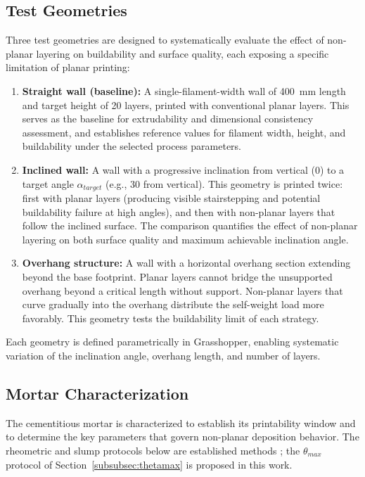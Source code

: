 \documentclass[conference]{IEEEtran}
\begin{document}
\subsection{Test Geometries}
\label{subsec:geom}

Three test geometries are designed to systematically evaluate the effect of non-planar layering on buildability and surface quality, each exposing a specific limitation of planar printing:

\begin{enumerate}
    \item \textbf{Straight wall (baseline):} A single-filament-width wall of 400~mm length and target height of 20 layers, printed with conventional planar layers. This serves as the baseline for extrudability and dimensional consistency assessment, and establishes reference values for filament width, height, and buildability under the selected process parameters.

    \item \textbf{Inclined wall:} A wall with a progressive inclination from vertical (0\textdegree) to a target angle $\alpha_{target}$ (e.g., 30\textdegree{} from vertical). This geometry is printed twice: first with planar layers (producing visible stairstepping and potential buildability failure at high angles), and then with non-planar layers that follow the inclined surface. The comparison quantifies the effect of non-planar layering on both surface quality and maximum achievable inclination angle.

    \item \textbf{Overhang structure:} A wall with a horizontal overhang section extending beyond the base footprint. Planar layers cannot bridge the unsupported overhang beyond a critical length without support. Non-planar layers that curve gradually into the overhang distribute the self-weight load more favorably. This geometry tests the buildability limit of each strategy.
\end{enumerate}

Each geometry is defined parametrically in Grasshopper, enabling systematic variation of the inclination angle, overhang length, and number of layers.

\subsection{Mortar Characterization}
\label{subsec:mortar}

The cementitious mortar is characterized to establish its printability window and to determine the key parameters that govern non-planar deposition behavior. The rheometric and slump protocols below are established methods \cite{bos_juxtaposing_2021, ducoulombier_slugs-test_2021, bao_testing_2024}; the $\theta_{max}$ protocol of Section~\ref{subsubsec:thetamax} is proposed in this work.
\end{document}
